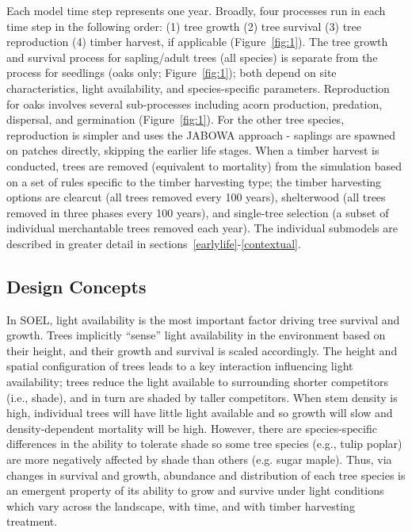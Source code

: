 \documentclass[
11pt, %
a4paper, %
oneside, %
headinclude,footinclude, %
]{scrartcl}
\begin{document}
Each model time step represents one year. Broadly, four processes run in each time step in the following order: (1) tree growth (2) tree survival (3) tree reproduction (4) timber harvest, if applicable (Figure~\ref{fig:1}). The tree growth and survival process for sapling/adult trees (all species) is separate from the process for seedlings (oaks only; Figure~\ref{fig:1}); both depend on site characteristics, light availability, and species-specific parameters. Reproduction for oaks involves several sub-processes including acorn production, predation, dispersal, and germination (Figure~\ref{fig:1}). For the other tree species, reproduction is simpler and uses the JABOWA approach - saplings are spawned on patches directly, skipping the earlier life stages. When a timber harvest is conducted, trees are removed (equivalent to mortality) from the simulation based on a set of rules specific to the timber harvesting type; the timber harvesting options are clearcut (all trees removed every 100 years), shelterwood (all trees removed in three phases every 100 years), and single-tree selection (a subset of individual merchantable trees removed each year). The individual submodels are described in greater detail in sections~\ref{earlylife}-\ref{contextual}.

\subsection{Design Concepts}

In SOEL, light availability is the most important factor driving tree survival and growth. Trees implicitly “sense” light availability in the environment based on their height, and their growth and survival is scaled accordingly. The height and spatial configuration of trees leads to a key interaction influencing light availability; trees reduce the light available to surrounding shorter competitors (i.e., shade), and in turn are shaded by taller competitors. When stem density is high, individual trees will have little light available and so growth will slow and density-dependent mortality will be high. However, there are species-specific differences in the ability to tolerate shade so some tree species (e.g., tulip poplar) are more negatively affected by shade than others (e.g. sugar maple). Thus, via changes in survival and growth, abundance and distribution of each tree species is an emergent property of its ability to grow and survive under light conditions which vary across the landscape, with time, and with timber harvesting treatment.
\end{document}
